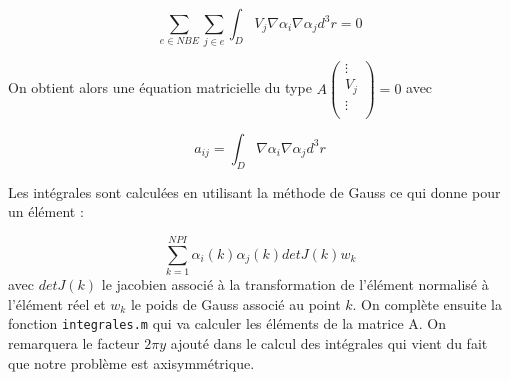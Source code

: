\documentclass[a4paper,12pt]{article}
\begin{document}
\begin{equation}
\sum_{e \in NBE} \sum_{j \in e} \int_{D} V_j \nabla \alpha_i \nabla \alpha_j d^3 r = 0
\end{equation}

On obtient alors une équation matricielle du type $A 
\left( \begin{array}{c}
\vdots \\
V_j \\
\vdots \\
\end{array} \right) 
 = 0$ avec

\begin{equation}
 a_{ij} = \int_{D} \nabla \alpha_i \nabla \alpha_j d^3 r 
\end{equation}

\medskip

Les intégrales sont calculées en utilisant la méthode de Gauss ce qui donne pour un élément :

\begin{equation}
\sum_{k=1}^{NPI} \alpha_i (k) \alpha_j (k) detJ(k) w_k
\end{equation}
avec $detJ(k)$ le jacobien associé à la transformation de l'élément normalisé à l'élément réel et $w_k$ le poids de Gauss associé au point $k$. On complète ensuite la fonction \verb|integrales.m| qui va calculer les éléments de la matrice A. On remarquera le facteur $2 \pi y$ ajouté dans le calcul des intégrales qui vient du fait que notre problème est axisymmétrique.

%





%      

%            
%                
%                

\end{document}
